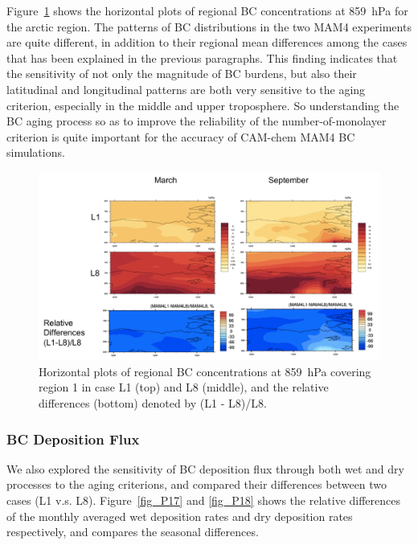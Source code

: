 \documentclass[12pt]{article}
\begin{document}
	Figure~\ref{fig_P20} shows the horizontal plots of regional BC concentrations at 859~hPa for the arctic region. The patterns of BC distributions in the two MAM4 experiments are quite different, in addition to their regional mean differences among the cases that has been explained in the previous paragraphs. This finding indicates that the sensitivity of not only the magnitude of BC burdens, but also their latitudinal and longitudinal patterns are both very sensitive to the aging criterion, especially in the middle and upper troposphere. So understanding the BC aging process so as to improve the reliability of the number-of-monolayer criterion is quite important for the accuracy of CAM-chem MAM4 BC simulations.
	
	
		\begin{figure}[H] 
			\begin{center}
				\includegraphics[width = 1\textwidth]{Figure20}
				\caption[]{\label{fig_P20} Horizontal plots of regional BC concentrations at 859~hPa covering region 1 in case L1 (top) and L8 (middle), and the relative differences (bottom) denoted by (L1 - L8)/L8.}
			\end{center}
		\end{figure}

	\subsubsection{BC Deposition Flux}
	We also explored the sensitivity of BC deposition flux through both wet and dry processes to the aging criterions, and compared their differences between two cases (L1 v.s. L8). Figure~\ref{fig_P17} and \ref{fig_P18} shows the relative differences of the monthly averaged wet deposition rates and dry deposition rates respectively, and compares the seasonal differences. 
	
\end{document}
